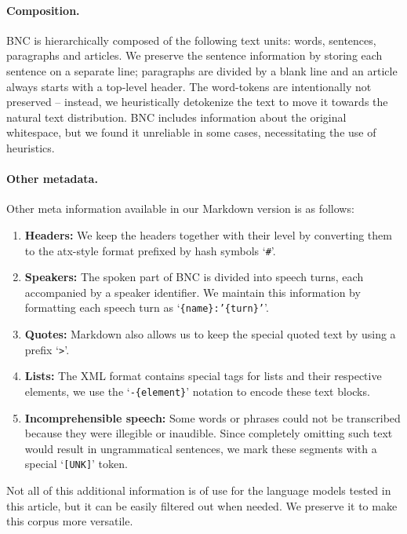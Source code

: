     \paragraph{Composition.} BNC is hierarchically composed of the following text units: words, sentences, paragraphs and articles. We preserve the sentence information by storing each sentence on a separate line; paragraphs are divided by a blank line and an article always starts with a top-level header. The word-tokens are intentionally not preserved -- instead, we heuristically detokenize the text to move it towards the natural text distribution. BNC includes information about the original whitespace, but we found it unreliable in some cases, necessitating the use of heuristics.

    
    \paragraph{Other metadata.} Other meta information available in our Markdown version is as follows:
    \begin{enumerate}
        \item \textbf{Headers:} We keep the headers together with their level by converting them to the atx-style format prefixed by hash symbols `\texttt{\#}'.
        \item \textbf{Speakers:} The spoken part of BNC is divided into speech turns, each accompanied by a speaker identifier. We maintain this information by formatting each speech turn as `\texttt{\{name\}:\textvisiblespace'\{turn\}'}'.
        \item \textbf{Quotes:} Markdown also allows us to keep the special quoted text by using a prefix `\texttt{>\textvisiblespace}'.
        \item \textbf{Lists:} The XML format contains special tags for lists and their respective elements, we use the `\texttt{-\textvisiblespace\{element\}}' notation to encode these text blocks.
        \item \textbf{Incomprehensible speech:} Some words or phrases could not be transcribed because they were illegible or inaudible. Since completely omitting such text would result in ungrammatical sentences, we mark these segments with a special `\texttt{[UNK]}' token.
    \end{enumerate}
    
    \noindent
    Not all of this additional information is of use for the language models tested in this article, but it can be easily filtered out when needed. We preserve it to make this corpus more versatile.
    
